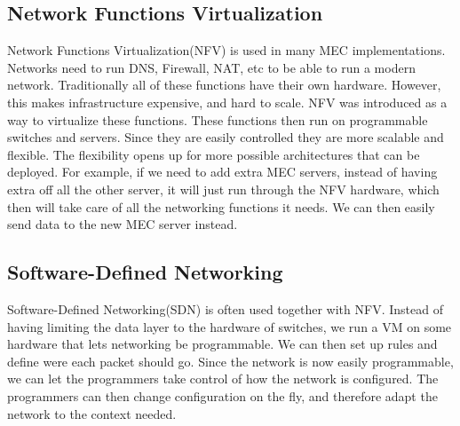\subsection{Network Functions Virtualization}
Network Functions Virtualization(NFV) is used in many MEC implementations\cite{patel_mec_nodate}. Networks need to run DNS, Firewall, NAT, etc to be able to run a modern network. Traditionally all of these functions have their own hardware. However, this makes infrastructure expensive, and hard to scale. NFV was introduced as a way to virtualize these functions. These functions then run on programmable switches and servers. Since they are easily controlled they are more scalable and flexible. The flexibility opens up for more possible architectures that can be deployed. For example, if we need to add extra MEC servers, instead of having extra off all the other server, it will just run through the NFV hardware, which then will take care of all the networking functions it needs. We can then easily send data to the new MEC server instead.

\subsection{Software-Defined Networking}
Software-Defined Networking(SDN) is often used together with NFV. Instead of having limiting the data layer to the hardware of switches, we run a VM on some hardware that lets networking be programmable. We can then set up rules and define were each packet should go. Since the network is now easily programmable, we can let the programmers take control of how the network is configured. The programmers can then change configuration on the fly, and therefore adapt the network to the context needed.






